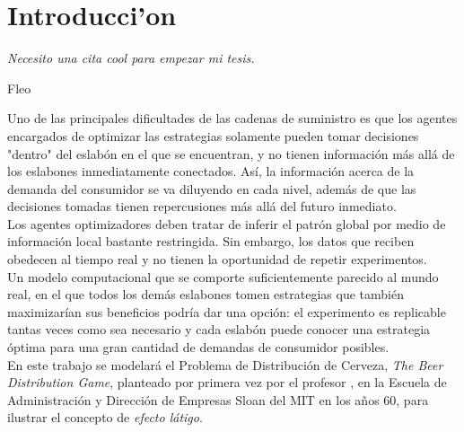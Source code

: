 \chapter{Introducci'on}

\textit{Necesito una cita cool para empezar mi tesis.}
\begin{flushright}
 Fleo
 \end{flushright}

\vspace{10 pt}





Uno de las principales dificultades de las cadenas de suministro es que los agentes encargados de optimizar las estrategias solamente pueden tomar decisiones "dentro" del eslabón en el que se encuentran, y no tienen información más allá de los eslabones inmediatamente conectados. Así, la información acerca de la demanda del consumidor se va diluyendo en cada nivel, además de que las decisiones tomadas tienen repercusiones más allá del futuro inmediato. \\

Los agentes optimizadores deben tratar de inferir el patrón global por medio de información local bastante restringida. Sin embargo, los datos que reciben obedecen al tiempo real y no tienen la oportunidad de repetir experimentos.\\

Un modelo computacional que se comporte suficientemente parecido al mundo real, en el que todos los demás eslabones tomen estrategias que también maximizarían sus beneficios podría dar una opción: el experimento es replicable tantas veces como sea necesario y cada eslabón puede conocer una estrategia óptima para una gran cantidad de demandas de consumidor posibles.\\

En este trabajo se modelará el Problema de Distribución de Cerveza, \textit{The Beer Distribution Game}, planteado por primera vez por el profesor \citet{Forrester}, en la Escuela de Administraci\'on y Direcci\'on de Empresas Sloan del MIT en los años 60, para ilustrar el concepto de \textit{efecto l\'atigo}. \\


